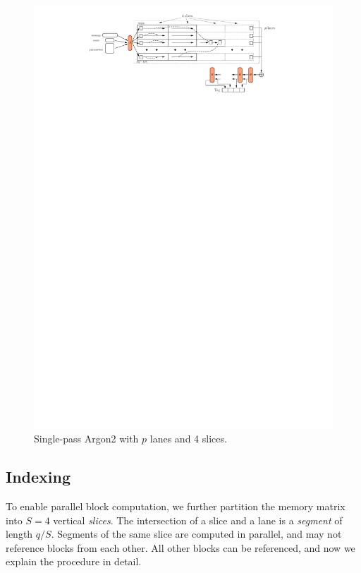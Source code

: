 \documentclass[a4paper]{article}
\begin{document}
 \begin{figure}[ht]
  \ifpdf
\begin{center}
  \includegraphics[scale=0.5]{pics/argon2-par.pdf}
  \caption{Single-pass \textsf{Argon2} with $p$ lanes and 4 slices. }\label{fig:argon2}
\end{center}
\fi
  \end{figure}

\subsection{Indexing}\label{sec:index}

To enable parallel block computation, we further partition the memory matrix into  $S=4$ vertical \emph{slices}. The intersection of a slice and a lane is a \emph{segment} of length $q/S$.  Segments of the same slice
  are computed in parallel, and may not reference blocks from each other. All other blocks can be referenced, and now we explain the procedure in detail.
\end{document}
